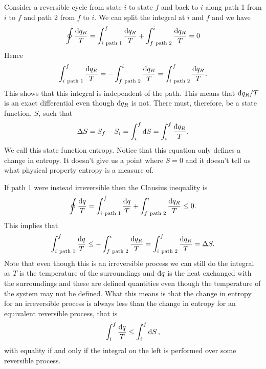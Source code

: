 \documentclass[a4paper]{article}
\newcommand{\ddbar}[1]{\text{\dj}{#1}}
\begin{document}
    Consider a reversible cycle from state \(i\) to state \(f\) and back to \(i\) along path 1 from \(i\) to \(f\) and path 2 from \(f\) to \(i\).
    We can split the integral at \(i\) and \(f\) and we have
    \[\oint \frac{\ddbar{q_R}}{T} = \int_{i~\text{path 1}}^{f} \frac{\ddbar{q_R}}{T} + \int_{f~\text{path 2}}^{i} \frac{\ddbar{q_R}}{T} = 0\]
    Hence
    \[\int_{i~\text{path 1}}^{f} \frac{\ddbar{q_R}}{T} = -\int_{f~\text{path 2}}^{i} \frac{\ddbar{q_R}}{T} = \int_{i~\text{path 2}}^{f} \frac{\ddbar{q_R}}{T}.\]
    This shows that this integral is independent of the path.
    This means that \(\ddbar{q_R}/T\) is an exact differential even though \(\ddbar{q_R}\) is not.
    There must, therefore, be a state function, \(S\), such that
    \[\Delta S = S_f - S_i = \int_i^f \dd{S} = \int_i^f \frac{\ddbar{q_R}}{T}.\]
    We call this state function entropy.
    Notice that this equation only defines a change in entropy.
    It doesn't give us a point where \(S = 0\) and it doesn't tell us what physical property entropy is a measure of.
    
    If path 1 were instead irreversible then the Clausius inequality is
    \[\oint \frac{\ddbar{q}}{T} = \int_{i~\text{path 1}}^{f} \frac{\ddbar{q}}{T} + \int_{f~\text{path 2}}^{i} \frac{\ddbar{q_R}}{T} \le 0.\]
    This implies that
    \[\int_{i~\text{path 1}}^{f} \frac{\ddbar{q}}{T} \le -\int_{f~\text{path 2}}^{i} \frac{\ddbar{q_R}}{T} = \int_{i~\text{path 2}}^{f} \frac{\ddbar{q_R}}{T} = \Delta S.\]
    Note that even though this is an irreversible process we can still do the integral as \(T\) is the temperature of the surroundings and \(\ddbar{q}\) is the heat exchanged with the surroundings and these are defined quantities even though the temperature of the system may not be defined.
    What this means is that the change in entropy for an irreversible process is always less than the change in entropy for an equivalent reversible process, that is
    \[\int_i^f\frac{\ddbar{q}}{T} \le \int_i^f \dd{S},\]
    with equality if and only if the integral on the left is performed over some reversible process.
    
\end{document}
